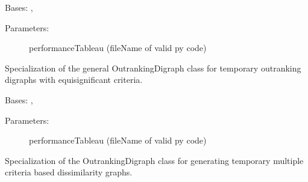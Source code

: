 \documentclass[letterpaper,10pt,english]{sphinxmanual}
\begin{document}

\begin{fulllineitems}
\label{techDoc:outrankingDigraphs.EquiSignificanceMajorityOutrankingDigraph}
Bases: {\hyperref[techDoc:outrankingDigraphs.BipolarOutrankingDigraph]{\emph{}}}, {\hyperref[techDoc:perfTabs.PerformanceTableau]{\emph{}}}
\begin{description}
\item[{Parameters:}] \leavevmode
performanceTableau (fileName of valid py code)

\end{description}

Specialization of the general OutrankingDigraph class for 
temporary outranking digraphs with equisignificant criteria.

\end{fulllineitems}


\begin{fulllineitems}
\label{techDoc:outrankingDigraphs.MultiCriteriaDissimilarityDigraph}
Bases: {\hyperref[techDoc:outrankingDigraphs.OutrankingDigraph]{\emph{}}}, {\hyperref[techDoc:perfTabs.PerformanceTableau]{\emph{}}}
\begin{description}
\item[{Parameters:}] \leavevmode
performanceTableau (fileName of valid py code)

\end{description}

Specialization of the OutrankingDigraph class for generating
temporary multiple criteria based dissimilarity graphs.

\end{fulllineitems}

\end{document}
